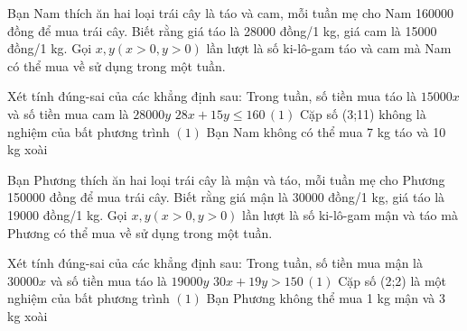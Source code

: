 \begin{ex}
 Bạn Nam thích ăn hai loại trái cây là táo và cam, mỗi tuần mẹ cho Nam 160000 đồng để mua trái cây. Biết rằng giá táo là 28000 đồng/1 kg, giá cam là 15000 đồng/1 kg. Gọi $x, y (x>0, y>0)$ lần lượt là số ki-lô-gam táo và cam mà Nam có thể mua về sử dụng trong một tuần.

 Xét tính đúng-sai của các khẳng định sau:
\choiceTFt
{ Trong tuần, số tiền mua táo là ${15000x}$ và số tiền mua cam là ${28000y}$ }
   { \True $28 x + 15 y\le 160 \, (1)$ }
     { \True  Cặp số (3;11) không là  nghiệm của bất phương trình $(1)$ }
    { \True  Bạn Nam không có thể mua 7 kg táo và 10 kg xoài }
\end{ex}

\begin{ex}
 Bạn Phương thích ăn hai loại trái cây là mận và táo, mỗi tuần mẹ cho Phương 150000 đồng để mua trái cây. Biết rằng giá mận là 30000 đồng/1 kg, giá táo là 19000 đồng/1 kg. Gọi $x, y (x>0, y>0)$ lần lượt là số ki-lô-gam mận và táo mà Phương có thể mua về sử dụng trong một tuần.

 Xét tính đúng-sai của các khẳng định sau:
\choiceTFt
{ \True Trong tuần, số tiền mua mận là ${30000x}$ và số tiền mua táo là ${19000y}$ }
   { $30 x + 19 y>150 \, (1)$ }
     { \True  Cặp số (2;2) là một nghiệm của bất phương trình $(1)$ }
    { Bạn Phương không thể mua 1 kg mận và 3 kg xoài }
\end{ex}

